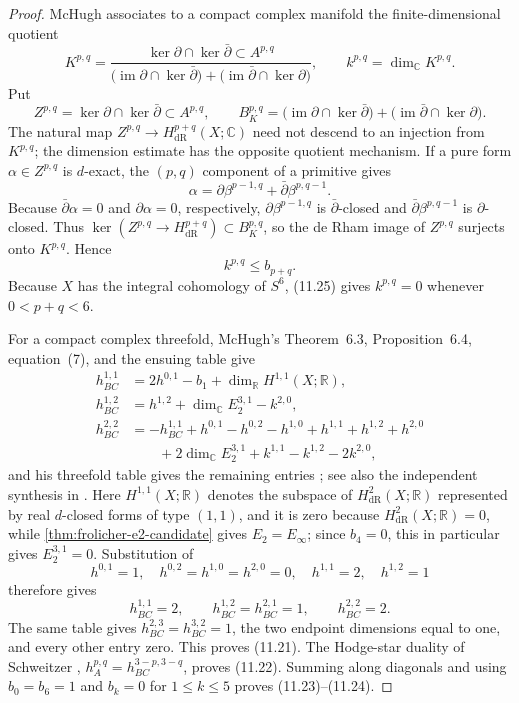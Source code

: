 \begin{proof}
McHugh associates to a compact complex manifold the finite-dimensional
quotient
\[
 K^{p,q}=
 \frac{\ker\partial\cap\ker\bar\partial\subset A^{p,q}}
 {\bigl(\operatorname{im}\partial\cap\ker\bar\partial\bigr)
  +\bigl(\operatorname{im}\bar\partial\cap\ker\partial\bigr)},
 \qquad k^{p,q}=\dim_{\mathbb C}K^{p,q}.
\]
Put
\[
 Z^{p,q}=\ker\partial\cap\ker\bar\partial\subset A^{p,q},
 \qquad
 B_K^{p,q}=
 \bigl(\operatorname{im}\partial\cap\ker\bar\partial\bigr)
 +\bigl(\operatorname{im}\bar\partial\cap\ker\partial\bigr).
\]
The natural map $Z^{p,q}\to H^{p+q}_{\mathrm{dR}}(X;\mathbb C)$ need not
descend to an injection from $K^{p,q}$; the dimension estimate has the
opposite quotient mechanism.  If a pure form $\alpha\in Z^{p,q}$ is
$d$-exact, the $(p,q)$ component of a primitive gives
\[
 \alpha=\partial\beta^{p-1,q}+\bar\partial\beta^{p,q-1}.
\]
Because $\bar\partial\alpha=0$ and $\partial\alpha=0$, respectively,
$\partial\beta^{p-1,q}$ is $\bar\partial$-closed and
$\bar\partial\beta^{p,q-1}$ is $\partial$-closed.  Thus
$\ker(Z^{p,q}\to H^{p+q}_{\mathrm{dR}})\subset B_K^{p,q}$, so the de Rham
image of $Z^{p,q}$ surjects onto $K^{p,q}$.  Hence
\[
 k^{p,q}\le b_{p+q}.
\tag{11.25}
\]
Because $X$ has the integral cohomology of $S^6$, (11.25) gives
$k^{p,q}=0$ whenever $0<p+q<6$.

For a compact complex threefold, McHugh's Theorem~6.3,
Proposition~6.4, equation~(7), and the ensuing table give
\begin{align*}
 h^{1,1}_{BC}
 &=2h^{0,1}-b_1+\dim_{\mathbb R}H^{1,1}(X;\mathbb R),\\
 h^{1,2}_{BC}
 &=h^{1,2}+\dim_{\mathbb C}E_2^{3,1}-k^{2,0},\\
 h^{2,2}_{BC}
 &=-h^{1,1}_{BC}+h^{0,1}-h^{0,2}-h^{1,0}+h^{1,1}
   +h^{1,2}+h^{2,0}\\
 &\hspace{2em}+2\dim_{\mathbb C}E_2^{3,1}
   +k^{1,1}-k^{1,2}-2k^{2,0},
\end{align*}
and his threefold table gives the remaining entries
\cite[Theorem~6.3, Proposition~6.4, equation~(7), \S7.1]{McHugh2019}; see also the
independent synthesis in \cite[\S4]{Angella2018}.  Here
$H^{1,1}(X;\mathbb R)$ denotes the subspace of
$H^2_{\mathrm{dR}}(X;\mathbb R)$ represented by real $d$-closed forms of
type $(1,1)$, and it is zero because $H^2_{\mathrm{dR}}(X;\mathbb R)=0$,
while \cref{thm:frolicher-e2-candidate} gives $E_2=E_\infty$; since
$b_4=0$, this in particular gives $E_2^{3,1}=0$.  Substitution of
\[
 h^{0,1}=1,\quad h^{0,2}=h^{1,0}=h^{2,0}=0,\quad
 h^{1,1}=2,\quad h^{1,2}=1
\]
therefore gives
\[
 h^{1,1}_{BC}=2,\qquad h^{1,2}_{BC}=h^{2,1}_{BC}=1,\qquad
 h^{2,2}_{BC}=2.
\]
The same table gives
$h^{2,3}_{BC}=h^{3,2}_{BC}=1$, the two endpoint dimensions equal to one,
and every other entry zero.  This proves (11.21).  The Hodge-star duality
of Schweitzer \cite[\S2.c, pp.~9--10]{Schweitzer2007},
$h_A^{p,q}=h_{BC}^{3-p,3-q}$, proves (11.22).  Summing along diagonals and
using $b_0=b_6=1$ and $b_k=0$ for $1\le k\le5$ proves
(11.23)--(11.24).
\end{proof}

